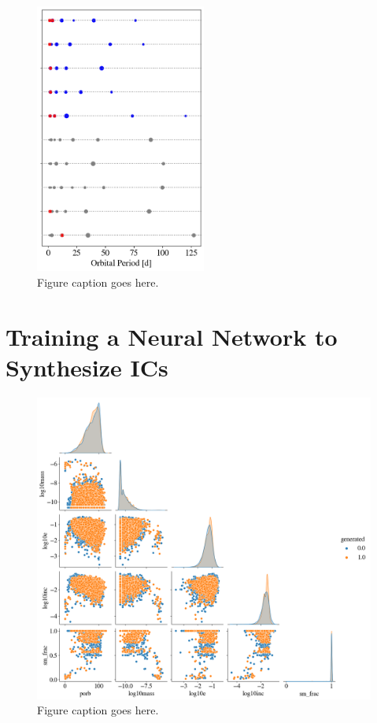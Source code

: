 \begin{figure}
\begin{center}
    \includegraphics[width=0.5\textwidth]{figures/stip/architectures_iso_comp.png}
    \caption{Figure caption goes here.\label{fig:architectures_iso_comp}}
\end{center}
\end{figure}

\section{Training a Neural Network to Synthesize ICs} \label{sec:neuralICs}

\begin{figure}
\begin{center}
    \includegraphics[width=\textwidth]{figures/stip/real_syn_corner.png}
    \caption{Figure caption goes here.\label{fig:real_syn_corner}}
\end{center}
\end{figure}


